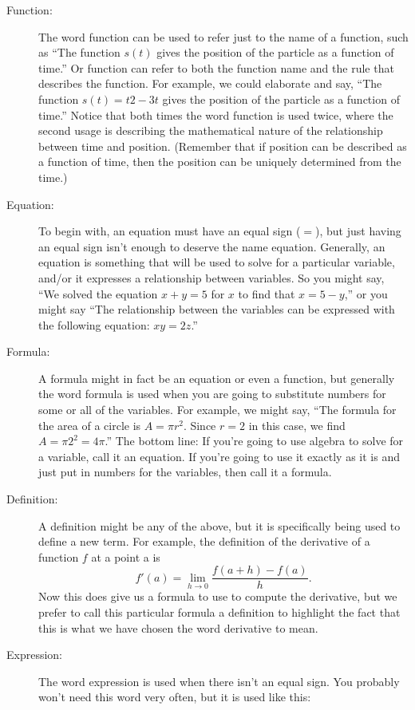 \documentclass[
]{book}
\theoremstyle{definition}
\theoremstyle{definition}
\theoremstyle{definition}
\theoremstyle{remark}
\begin{document}
\begin{description}
\item[Function:]
The word function can be used to refer just to the name of a
function, such as ``The function \(s(t)\) gives the position of the
particle as a function of time.'' Or function can refer to both the
function name and the rule that describes the function. For example,
we could elaborate and say, ``The function \(s(t) = t2 - 3t\) gives the
position of the particle as a function of time.'' Notice that both
times the word function is used twice, where the second usage is
describing the mathematical nature of the relationship between time
and position. (Remember that if position can be described as a
function of time, then the position can be uniquely determined from
the time.)
\item[Equation:]
To begin with, an equation must have an equal sign (\(=\)), but just
having an equal sign isn't enough to deserve the name equation.
Generally, an equation is something that will be used to solve for a
particular variable, and/or it expresses a relationship between
variables. So you might say, ``We solved the equation \(x + y = 5\) for
\(x\) to find that \(x = 5 - y\),'' or you might say ``The relationship
between the variables can be expressed with the following equation:
\(xy = 2z\).''
\item[Formula:]
A formula might in fact be an equation or even a function, but
generally the word formula is used when you are going to substitute
numbers for some or all of the variables. For example, we might say,
``The formula for the area of a circle is \(A = \pi r^2\). Since
\(r = 2\) in this case, we find \(A = \pi  2^2 = 4\pi\).'' The bottom line: If you're going to use
algebra to solve for a variable, call it an equation. If you're
going to use it exactly as it is and just put in numbers for the
variables, then call it a formula.
\item[Definition:]
A definition might be any of the above, but it is specifically being
used to define a new term. For example, the definition of the
derivative of a function \(f\) at a point a is
\[f'(a) = \lim_{h \to 0} \frac{f(a+h)-f(a)}{h}.\] Now this does give
us a formula to use to compute the derivative, but we prefer to call
this particular formula a definition to highlight the fact that this
is what we have chosen the word derivative to mean.
\item[Expression:]
The word expression is used when there isn't an equal sign. You
probably won't need this word very often, but it is used like this:

\end{description}
\end{document}
